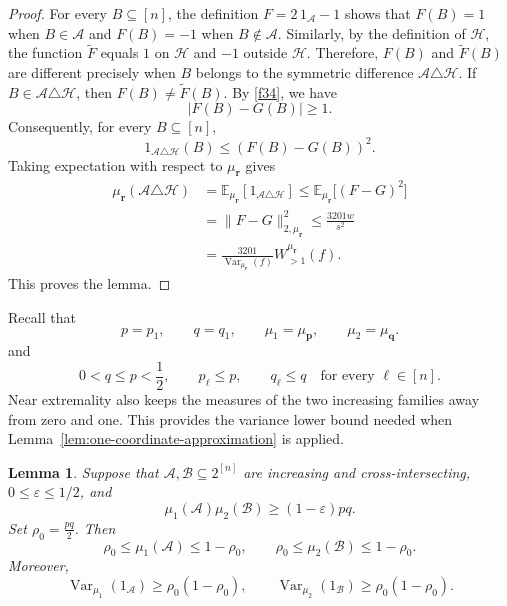 \documentclass[11pt]{article}
\numberwithin{equation}{section}
\newtheorem{lemma}[theorem]{Lemma}
\theoremstyle{definition}
\theoremstyle{remark}
\begin{document}
\begin{proof}
For every $B\subseteq[n]$, the definition $F=2\,1_{\mathcal A}-1$
shows that $F(B)=1$ when $B\in\mathcal A$ and $F(B)=-1$ when
$B\notin\mathcal A$. Similarly, by the definition of $\mathcal H$,
the function $\widetilde F$ equals $1$ on $\mathcal H$ and $-1$
outside $\mathcal H$. Therefore, $F(B)$ and $\widetilde F(B)$ are
different precisely when $B$ belongs to the symmetric difference
$\mathcal A\triangle\mathcal H$.
If $B\in\mathcal A\triangle\mathcal H$, then
$F(B)\neq\widetilde F(B)$. By \eqref{f34}, we have
$$
|F(B)-G(B)|\geq1.
$$
Consequently, for every $B\subseteq[n]$,
$$
1_{\mathcal A\triangle\mathcal H}(B)
\leq
(F(B)-G(B))^2.
$$
Taking expectation with respect to $\mu_{\mathbf r}$ gives
$$
\begin{aligned}
\mu_{\mathbf r}(\mathcal A\triangle\mathcal H)
&=
\mathbb E_{\mu_{\mathbf r}}
[1_{\mathcal A\triangle\mathcal H}]\leq
\mathbb E_{\mu_{\mathbf r}}\bigl[(F-G)^2\bigr]\\
&=
\|F-G\|_{2,\mu_{\mathbf r}}^2\leq
\frac{3201w}{s^2}\\
&=
\frac{3201}
{\operatorname{Var}_{\mu_{\mathbf r}}(f)}
W_{>1}^{\mu_{\mathbf r}}(f).
\end{aligned}
$$
This proves the lemma.
\end{proof}


Recall that
$$
 p=p_1,\qquad q=q_1,\qquad
 \mu_1=\mu_{\mathbf p},\qquad
 \mu_2=\mu_{\mathbf q}.
$$
and
$$
 0<q\leq p<\frac12,\qquad
 p_\ell\leq p,\qquad q_\ell\leq q
 \quad\text{for every }\ell\in[n].
$$
Near extremality also keeps the measures of the two increasing
families away from zero and one. This provides the variance lower
bound needed when Lemma~\ref{lem:one-coordinate-approximation} is
applied.

\begin{lemma}\label{lem:variance-lower-bound}
Suppose that $\mathcal A,\mathcal B\subseteq 2^{[n]}$ are increasing
and cross-intersecting, $0\leq\varepsilon\leq 1/2$, and
$$
\mu_1(\mathcal A)\mu_2(\mathcal B)
\geq
(1-\varepsilon)pq.
$$
Set
$
\rho_0=\frac{pq}{2}.
$
Then
$$
\rho_0\leq\mu_1(\mathcal A)\leq1-\rho_0,
\qquad
\rho_0\leq\mu_2(\mathcal B)\leq1-\rho_0.
$$
Moreover,
$$
\operatorname{Var}_{\mu_1}(1_{\mathcal A})
\geq
\rho_0(1-\rho_0),
\qquad
\operatorname{Var}_{\mu_2}(1_{\mathcal B})
\geq
\rho_0(1-\rho_0).
$$
\end{lemma}
\end{document}
